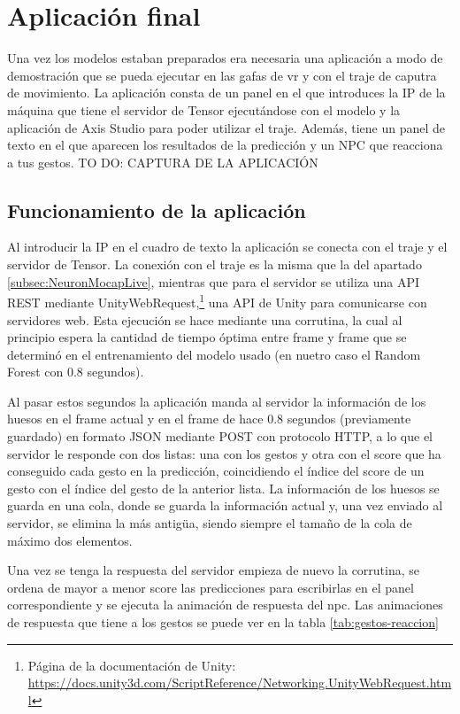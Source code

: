 \section{Aplicación final}
\label{sec:aplicacionFinal}
Una vez los modelos estaban preparados era necesaria una aplicación a modo de demostración que se pueda ejecutar en las gafas de \gls{vr} y con el traje de caputra de movimiento.
La aplicación consta de un panel en el que introduces la IP de la máquina que tiene el servidor de Tensor ejecutándose con el modelo y la aplicación de Axis Studio para poder utilizar el traje.
Además, tiene un panel de texto en el que aparecen los resultados de la predicción y un NPC que reacciona a tus gestos.
TO DO: CAPTURA DE LA APLICACIÓN
\subsection{Funcionamiento de la aplicación}
Al introducir la IP en el cuadro de texto la aplicación se conecta con el traje y el servidor de Tensor. La conexión con el traje es la misma que la del apartado \ref{subsec:NeuronMocapLive}, mientras que para el servidor se utiliza una \gls{API REST} mediante UnityWebRequest,\footnote{Página de la documentación de Unity: \url{https://docs.unity3d.com/ScriptReference/Networking.UnityWebRequest.html}} una API de Unity para comunicarse con servidores web.
Esta ejecución se hace mediante una corrutina, la cual al principio espera la cantidad de tiempo óptima entre frame y frame que se determinó en el entrenamiento del modelo usado (en nuetro caso el Random Forest con 0.8 segundos).

Al pasar estos segundos la aplicación manda al servidor la información de los huesos en el frame actual y en el frame de hace 0.8 segundos (previamente guardado) en formato JSON mediante POST con protocolo HTTP, a lo que el servidor le responde con dos listas: una con los gestos y otra con el score que ha conseguido cada gesto en la predicción, coincidiendo el índice del score de un gesto con el índice del gesto de la anterior lista. 
La información de los huesos se guarda en una cola, donde se guarda la información actual y, una vez enviado al servidor, se elimina la más antigüa, siendo siempre el tamaño de la cola de máximo dos elementos.

Una vez se tenga la respuesta del servidor empieza de nuevo la corrutina, se ordena de mayor a menor score las predicciones para escribirlas en el panel correspondiente y se ejecuta la animación de respuesta del \gls{npc}.
Las animaciones de respuesta que tiene a los gestos se puede ver en la tabla \ref{tab:gestos-reaccion}

